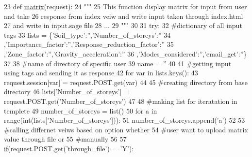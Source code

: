 \begin{DoxyCode}
23 \textcolor{keyword}{def }\hyperlink{namespacecivilsage_1_1views_a8b58c93a9c82e84143c43dafaa744a4b}{matrix}(request):
24     \textcolor{stringliteral}{"""}
25 \textcolor{stringliteral}{    This function display matrix for input from user and take}
26 \textcolor{stringliteral}{    response from index veiw and write input taken through index.html}
27 \textcolor{stringliteral}{    and write in input.sage file}
28 \textcolor{stringliteral}{    ...}
29 \textcolor{stringliteral}{    """}
30 
31     \textcolor{keywordflow}{try}:
32         \textcolor{comment}{#dictionary of all input tags}
33         lists = \{\textcolor{stringliteral}{'Soil\_type'}:\textcolor{stringliteral}{''},\textcolor{stringliteral}{'Number\_of\_storeys'}:\textcolor{stringliteral}{''}
34         ,\textcolor{stringliteral}{'Importance\_factor'}:\textcolor{stringliteral}{''},\textcolor{stringliteral}{'Response\_reduction\_factor'}:\textcolor{stringliteral}{''}
35         ,\textcolor{stringliteral}{'Zone\_factor'}:\textcolor{stringliteral}{''},\textcolor{stringliteral}{'Gravity\_acceleration'}:\textcolor{stringliteral}{''}
36         ,\textcolor{stringliteral}{'Modes\_considered'}:\textcolor{stringliteral}{''},\textcolor{stringliteral}{'email\_get'}:\textcolor{stringliteral}{''}\}
37 
38         \textcolor{comment}{#name of directory of specific user}
39         name = \textcolor{stringliteral}{''}
40 
41         \textcolor{comment}{#getting input using tags and sending it as response}
42         \textcolor{keywordflow}{for} var \textcolor{keywordflow}{in} lists.keys():
43             request.session[var] = request.POST.get(var)
44 
45         \textcolor{comment}{#creating directory from base directory}
46         lists[\textcolor{stringliteral}{'Number\_of\_storeys'}] = request.POST.get(\textcolor{stringliteral}{'Number\_of\_storeys'})
47 
48         \textcolor{comment}{#making list for iteratation in templete}
49         number\_of\_storeys = list()
50         \textcolor{keywordflow}{for} a \textcolor{keywordflow}{in} range(int(lists[\textcolor{stringliteral}{'Number\_of\_storeys'}])):
51             number\_of\_storeys.append(\textcolor{stringliteral}{'a'})
52 
53         \textcolor{comment}{#calling differnet veiws based on option whether}
54         \textcolor{comment}{#user want to upload matrix value through file or}
55         \textcolor{comment}{#manually}
56 
57         \hyperlink{bootstrap_8min_8js_ac2d69f5011896c6ed4a54e0dd36f6334}{if}(request.POST.get(\textcolor{stringliteral}{'through\_file'})==\textcolor{stringliteral}{'Y'}):

\end{DoxyCode}
